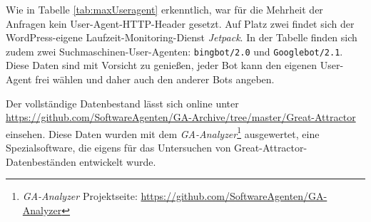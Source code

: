 Wie in Tabelle \ref{tab:maxUseragent} erkenntlich, war für die Mehrheit der
Anfragen kein User-Agent-HTTP-Header gesetzt. Auf Platz zwei findet sich der
WordPress-eigene Laufzeit-Monitoring-Dienst \emph{Jetpack}. In der Tabelle
finden sich zudem zwei Suchmaschinen-User-Agenten: \texttt{bingbot/2.0} und
\texttt{Googlebot/2.1}. Diese Daten sind mit Vorsicht zu genießen, jeder Bot
kann den eigenen User-Agent frei wählen und daher auch den anderer Bots angeben.

Der vollständige Datenbestand lässt sich online unter
\url{https://github.com/SoftwareAgenten/GA-Archive/tree/master/Great-Attractor}
einsehen. Diese Daten wurden mit dem
\emph{GA-Analyzer}\footnote{\emph{GA-Analyzer} Projektseite:
\url{https://github.com/SoftwareAgenten/GA-Analyzer}} ausgewertet, eine
Spezialsoftware, die eigens für das Untersuchen von
Great-Attractor-Datenbeständen entwickelt wurde.
